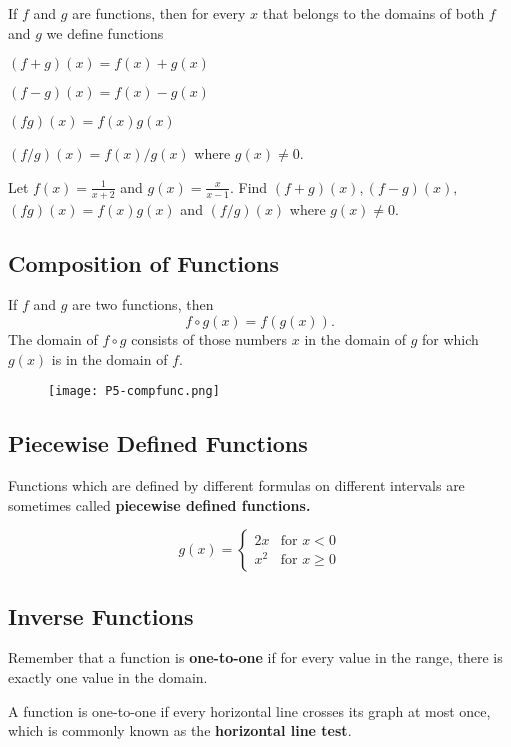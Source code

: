 \documentclass[../main.tex]{subfiles}
\begin{document}
If $f$ and $g$ are functions, then for every $x$ that belongs to the domains
of both $f$ and $g$ we define functions

$(f+g)(x)=f(x)+g(x)$

$(f-g)(x)=f(x)-g(x)$

$(fg)(x)=f(x)g(x)$

$(f/g)(x)=f(x)/g(x)$ where $g(x)\neq 0.$

\begin{example}
Let $f(x)=\frac{1}{x+2}$ and $g(x)=\frac{x}{x-1}$. Find $(f+g)(x),(f-g)(x),$
$(fg)(x)=f(x)g(x)$ and $(f/g)(x)$ where $g(x)\neq 0.$
\end{example}

\subsection*{Composition of Functions}
If $f$ and $g$ are two functions, then
\[
  f\circ g(x)=f(g(x)).
\]
The domain of $f\circ g$ consists of those numbers $x$
in the domain of $g$ for which $g(x)$ is in the domain of $f$.


\begin{example}
  \begin{figure}[H]
    \centering
    \texttt{[image: P5-compfunc.png]}
  \end{figure}
\end{example}
\subsection*{Piecewise Defined Functions}
Functions which are defined by different formulas on different intervals are sometimes called \textbf{piecewise defined functions.}

\begin{example}
  \[
  g(x) =
  \begin{cases}
      2x & \text{for } x<0 \\
      x^2 & \text{for }x\geq0
  \end{cases}
  \]
\end{example}


\subsection*{Inverse Functions}
Remember that a function is \textbf{one-to-one} if for every value in the range, there is exactly one value in the domain.

A function is one-to-one if every horizontal line crosses its graph at most once, which is commonly known as the \textbf{horizontal line test}.
\end{document}
